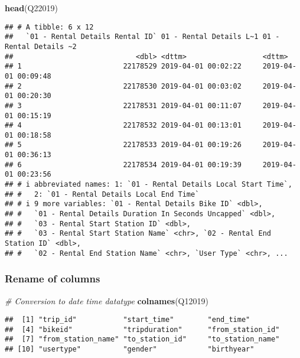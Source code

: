 \documentclass[
]{article}
\newenvironment{Shaded}{\begin{snugshade}}{\end{snugshade}}
\newcommand{\CommentTok}[1]{\textcolor[rgb]{0.56,0.35,0.01}{\textit{#1}}}
\newcommand{\FunctionTok}[1]{\textcolor[rgb]{0.13,0.29,0.53}{\textbf{#1}}}
\newcommand{\NormalTok}[1]{#1}
\begin{document}
\begin{Shaded}
\begin{Highlighting}[]
\FunctionTok{head}\NormalTok{(Q22019)}
\end{Highlighting}
\end{Shaded}

\begin{verbatim}
## # A tibble: 6 x 12
##   `01 - Rental Details Rental ID` 01 - Rental Details L~1 01 - Rental Details ~2
##                             <dbl> <dttm>                  <dttm>                
## 1                        22178529 2019-04-01 00:02:22     2019-04-01 00:09:48   
## 2                        22178530 2019-04-01 00:03:02     2019-04-01 00:20:30   
## 3                        22178531 2019-04-01 00:11:07     2019-04-01 00:15:19   
## 4                        22178532 2019-04-01 00:13:01     2019-04-01 00:18:58   
## 5                        22178533 2019-04-01 00:19:26     2019-04-01 00:36:13   
## 6                        22178534 2019-04-01 00:19:39     2019-04-01 00:23:56   
## # i abbreviated names: 1: `01 - Rental Details Local Start Time`,
## #   2: `01 - Rental Details Local End Time`
## # i 9 more variables: `01 - Rental Details Bike ID` <dbl>,
## #   `01 - Rental Details Duration In Seconds Uncapped` <dbl>,
## #   `03 - Rental Start Station ID` <dbl>,
## #   `03 - Rental Start Station Name` <chr>, `02 - Rental End Station ID` <dbl>,
## #   `02 - Rental End Station Name` <chr>, `User Type` <chr>, ...
\end{verbatim}

\hypertarget{rename-of-columns}{%
\subsubsection{Rename of columns}\label{rename-of-columns}}

\begin{Shaded}
\begin{Highlighting}[]
\CommentTok{\# Conversion to date time datatype}
\FunctionTok{colnames}\NormalTok{(Q12019)}
\end{Highlighting}
\end{Shaded}

\begin{verbatim}
##  [1] "trip_id"           "start_time"        "end_time"         
##  [4] "bikeid"            "tripduration"      "from_station_id"  
##  [7] "from_station_name" "to_station_id"     "to_station_name"  
## [10] "usertype"          "gender"            "birthyear"
\end{verbatim}
\end{document}
